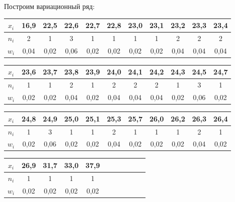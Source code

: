 \documentclass[utf8, a4paper, 14pt, russian, oneside]{book}
\begin{document}
Построим вариационный ряд:
\begin{table}[h!]
    \begin{tabular}{|c|c|c|c|c|c|c|c|c|c|c|}
        \hline
        $x_i$ & 16,9 & 22,5 & 22,6 & 22,7 & 22,8 & 23,0 & 23,1 & 23,2 & 23,3 & 23,4 \\
        \hline
        $n_i$ & 2 & 1 & 3 & 1 & 1 & 1 & 1 & 2 & 2 & 2\\
        \hline
        $w_i$ & 0,04 & 0,02 & 0,06 & 0,02 & 0,02 & 0,02 & 0,02 & 0,04 & 0,04 & 0,04 \\
        \hline
    \end{tabular}
\end{table}
\begin{table}[h!]
    \begin{tabular}{|c|c|c|c|c|c|c|c|c|c|c|}
        \hline
        $x_i$ & 23,6 & 23,7 & 23,8 & 23,9 & 24,0 & 24,1 & 24,2 & 24,3 & 24,5 & 24,7 \\
        \hline
        $n_i$ & 1 & 1 & 2 & 1 & 2 & 2 & 2 & 1 & 3 & 1 \\
        \hline
        $w_i$ & 0,02 & 0,02 & 0,04 & 0,02 & 0,04 & 0,04 & 0,04 & 0,02 & 0,06 & 0,02 \\
        \hline
    \end{tabular}
\end{table}
\newpage
\begin{table}[h!]
    \begin{tabular}{|c|c|c|c|c|c|c|c|c|c|c|}
        \hline
        $x_i$ & 24,8 & 24,9 & 25,0 & 25,1 & 25,3 & 25,7 & 26,0 & 26,2 & 26,3 & 26,4 \\
        \hline
        $n_i$ & 1 & 3 & 1 & 1 & 2 & 1 & 1 & 1 & 2 & 1 \\
        \hline
        $w_i$ & 0,02 & 0,06 & 0,02 & 0,02 & 0,04 & 0,02 & 0,02 & 0,02 & 0,04 & 0,02 \\
        \hline
    \end{tabular}
\end{table}
\begin{table}[h!]
    \begin{tabular}{|c|c|c|c|c|c|c|c|c|c|c|}
        \hline
        $x_i$ & 26,9 & 31,7 & 33,0 & 37,9\\
        \hline
        $n_i$ & 1 & 1 & 1 & 1 \\
        \hline
        $w_i$ & 0,02 & 0,02 & 0,02 & 0,02 \\
        \hline
    \end{tabular}
\end{table}
\end{document}
